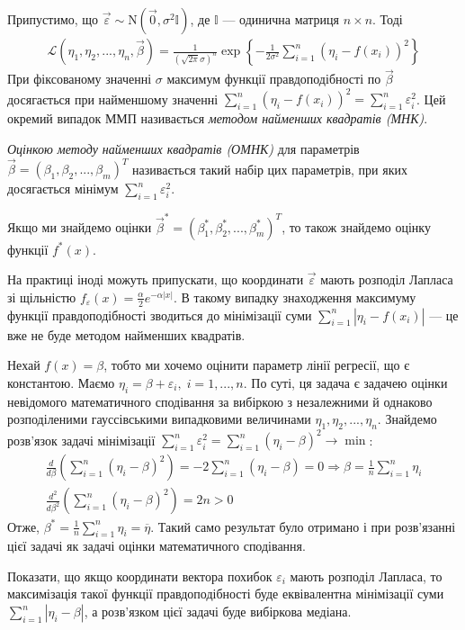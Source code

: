 Припустимо, що $\vec{\varepsilon} \sim \mathrm{N}(\vec{0}, \sigma^2 \mathbb{I})$, де
$\mathbb{I}$ --- одинична матриця $n\times n$. Тоді
\begin{gather*}
    \mathcal{L}\left(\eta_1, \eta_2, ..., \eta_n, \vec{\beta}\right) = 
    \frac{1}{\left(\sqrt{2\pi} \sigma\right)^n} \exp\left\{
        -\frac{1}{2\sigma^2} \sum_{i=1}^n (\eta_i - f(x_i))^2
        \right\}
\end{gather*}
При фіксованому значенні $\sigma$ максимум функції правдоподібності по $\vec{\beta}$ досягається
при найменшому значенні $\sum\limits_{i=1}^n (\eta_i - f(x_i))^2 = \sum\limits_{i=1}^n \varepsilon_i^2$.
Цей окремий випадок ММП називається \emph{методом найменших квадратів (МНК)}. 
\begin{definition}
    \emph{Оцінкою методу найменших квадратів (ОМНК)} для параметрів $\vec{\beta} = (\beta_1, \beta_2, ..., \beta_m)^T$
    називається такий набір цих параметрів, при яких досягається мінімум $\sum\limits_{i=1}^n \varepsilon_i^2$.
\end{definition}
Якщо ми знайдемо оцінки $\vec{\beta}^* = (\beta_1^*, \beta_2^*, ..., \beta_m^*)^T$,
то також знайдемо оцінку функції $f^*(x)$.
\begin{remark}
    На практиці іноді можуть припускати, що координати $\vec{\varepsilon}$ мають 
    розподіл Лапласа зі щільністю $f_\varepsilon(x) = \frac{\alpha}{2} e^{-\alpha|x|}$.
    В такому випадку знаходження максимуму функції правдоподібності зводиться
    до мінімізації суми $\sum\limits_{i=1}^n |\eta_i - f(x_i)|$ --- це вже не буде
    методом найменших квадратів.
\end{remark}
\begin{example}\label{intercept_fit}
    Нехай $f(x) = \beta$, тобто ми хочемо оцінити параметр лінії регресії, що є константою.
    Маємо $\eta_i = \beta + \varepsilon_i, \; i = 1,...,n$. По суті, ця задача є задачею оцінки невідомого математичного сподівання
    за вибіркою з незалежними й однаково розподіленими гауссівськими випадковими величинами
    $\eta_1, \eta_2, ..., \eta_n$. Знайдемо розв'язок задачі мінімізації
    $\sum\limits_{i=1}^n \varepsilon_i^2 = \sum\limits_{i=1}^n (\eta_i - \beta)^2 \to \min$:
    \begin{gather*}
        \frac{d}{d\beta} \left(\sum\limits_{i=1}^n (\eta_i - \beta)^2\right) = 
        - 2 \sum\limits_{i=1}^n (\eta_i - \beta) = 0 \Rightarrow \beta = \frac{1}{n} \sum\limits_{i=1}^n \eta_i \\
        \frac{d^2}{d\beta^2} \left(\sum\limits_{i=1}^n (\eta_i - \beta)^2\right) = 2n > 0
    \end{gather*}
    Отже, $\beta^* = \frac{1}{n}\sum\limits_{i=1}^n \eta_i = \overline{\eta}$. Такий само результат було
    отримано і при розв'язанні цієї задачі як задачі оцінки математичного сподівання.
\end{example}
\begin{exercise}
    Показати, що якщо координати вектора похибок $\varepsilon_i$ мають розподіл Лапласа, то максимізація
    такої функції правдоподібності буде еквівалентна мінімізації суми
    $\sum\limits_{i=1}^n |\eta_i - \beta|$, а розв'язком цієї задачі буде вибіркова медіана.
\end{exercise}

